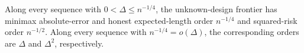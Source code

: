 Along every sequence with \(0<\Delta\leq n^{-1/4}\), the unknown-design frontier has minimax absolute-error and honest expected-length order \(n^{-1/4}\) and squared-risk order \(n^{-1/2}\).  Along every sequence with \(n^{-1/4}=o(\Delta)\), the corresponding orders are \(\Delta\) and \(\Delta^2\), respectively.
